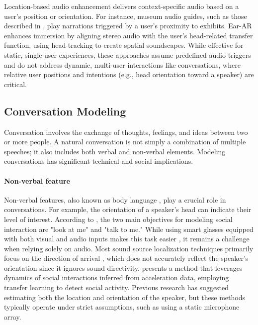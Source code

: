 Location-based audio enhancement delivers context-specific audio based on a user’s position or orientation. For instance, museum audio guides, such as those described in \cite{harma2004augmented}, play narrations triggered by a user’s proximity to exhibits. Ear-AR \cite{yang2020ear} enhances immersion by aligning stereo audio with the user’s head-related transfer function, using head-tracking to create spatial soundscapes. While effective for static, single-user experiences, these approaches assume predefined audio triggers and do not address dynamic, multi-user interactions like conversations, where relative user positions and intentions (e.g., head orientation toward a speaker) are critical.



\subsection{Conversation Modeling}
Conversation involves the exchange of thoughts, feelings, and ideas between two or more people. A natural conversation is not simply a combination of multiple speeches; it also includes both verbal and non-verbal elements. Modeling conversations has significant technical and social implications.

\paragraph{Non-verbal feature}
Non-verbal features, also known as body language \cite{d2010multimodal}, play a crucial role in conversations. For example, the orientation of a speaker's head can indicate their level of interest. According to \cite{grauman2022ego4d}, the two main objectives for modeling social interaction are "look at me" and "talk to me." While using smart glasses equipped with both visual and audio inputs makes this task easier \cite{donley2021easycom}, it remains a challenge when relying solely on audio. Most sound source localization techniques primarily focus on the direction of arrival \cite{wang2022nerc, yang2022deepear}, which does not accurately reflect the speaker's orientation since it ignores sound directivity. 
\cite{gedik2018detecting} presents a method that leverages dynamics of social interactions inferred from acceleration data, employing transfer learning to detect social activity.
Previous research \cite{ahuja2020direction} has suggested estimating both the location and orientation of the speaker, but these methods typically operate under strict assumptions, such as using a static microphone array.

